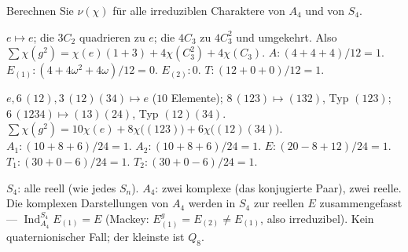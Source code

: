 \begin{aufgabe}
Berechnen Sie $\nu(\chi)$ für alle irreduziblen Charaktere von $A_4$ und von $S_4$.

\loesung
{}
$e\mapsto e$; die $3C_2$ quadrieren zu $e$; die $4C_3$ zu $4C_3^{2}$ und umgekehrt. Also $\sum\chi(g^{2}) = \chi(e)(1 + 3) + 4\chi(C_3^{2}) + 4\chi(C_3)$.
$A\colon(4 + 4 + 4)/12 = 1$. $E_{(1)}\colon(4 + 4\omega^{2} + 4\omega)/12 = 0$. $E_{(2)}\colon0$. $T\colon(12 + 0 + 0)/12 = 1$.

$e, 6\,(12), 3\,(12)(34)\mapsto e$ ($10$ Elemente); $8\,(123)\mapsto(132)$, Typ $(123)$; $6\,(1234)\mapsto(13)(24)$, Typ $(12)(34)$. $\sum\chi(g^{2}) = 10\chi(e) + 8\chi\bigl((123)\bigr) + 6\chi\bigl((12)(34)\bigr)$.
$A_1\colon(10 + 8 + 6)/24 = 1$. $A_2\colon(10 + 8 + 6)/24 = 1$. $E\colon(20 - 8 + 12)/24 = 1$. $T_1\colon(30 + 0 - 6)/24 = 1$. $T_2\colon(30 + 0 - 6)/24 = 1$.

$S_4$: alle reell (wie jedes $S_n$). $A_4$: zwei komplexe (das konjugierte Paar), zwei reelle. Die komplexen Darstellungen von $A_4$ werden in $S_4$ zur reellen $E$ zusammengefasst --- $\operatorname{Ind}^{S_4}_{A_4}E_{(1)} = E$ (Mackey: $E_{(1)}^{g} = E_{(2)}\neq E_{(1)}$, also irreduzibel). Kein quaternionischer Fall; der kleinste ist $Q_8$.

\begin{center}
\begin{minipage}{0.88\textwidth}
\end{minipage}
\end{center}
\end{aufgabe}

